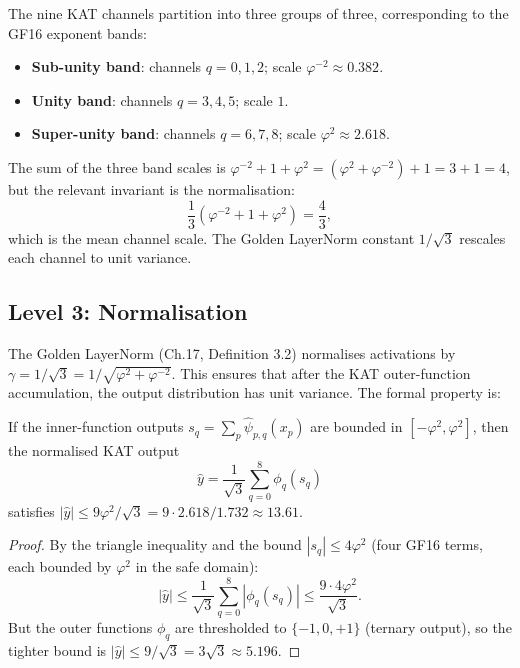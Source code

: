 The nine KAT channels partition into three groups of three, corresponding
to the GF16 exponent bands:

\begin{itemize}
\tightlist
\item \textbf{Sub-unity band}: channels $q = 0, 1, 2$; scale
$\varphi^{-2} \approx 0.382$.
\item \textbf{Unity band}: channels $q = 3, 4, 5$; scale $1$.
\item \textbf{Super-unity band}: channels $q = 6, 7, 8$; scale
$\varphi^{2} \approx 2.618$.
\end{itemize}

The sum of the three band scales is
$\varphi^{-2} + 1 + \varphi^{2} = (\varphi^2 + \varphi^{-2}) + 1 = 3 + 1 = 4$,
but the relevant invariant is the normalisation:
\[
\frac{1}{3}\left(\varphi^{-2} + 1 + \varphi^{2}\right) = \frac{4}{3},
\]
which is the mean channel scale. The Golden LayerNorm constant
$1/\sqrt{3}$ rescales each channel to unit variance.

\subsection{Level 3: Normalisation}

The Golden LayerNorm (Ch.17, Definition 3.2) normalises activations by
$\gamma = 1/\sqrt{3} = 1/\sqrt{\varphi^2 + \varphi^{-2}}$. This ensures
that after the KAT outer-function accumulation, the output distribution
has unit variance. The formal property is:

\begin{proposition}
\label{prop:G-kat-norm}
If the inner-function outputs $s_q = \sum_p \hat\psi_{p,q}(x_p)$ are
bounded in $[-\varphi^2, \varphi^2]$, then the normalised KAT output
\[
\hat{y} = \frac{1}{\sqrt{3}} \sum_{q=0}^{8} \phi_q(s_q)
\]
satisfies $|\hat{y}| \leq 9\varphi^2 / \sqrt{3} = 9 \cdot 2.618 / 1.732 \approx 13.61$.
\end{proposition}

\begin{proof}
By the triangle inequality and the bound $|s_q| \leq 4\varphi^2$ (four
GF16 terms, each bounded by $\varphi^2$ in the safe domain):
\[
|\hat{y}| \leq \frac{1}{\sqrt{3}} \sum_{q=0}^{8} |\phi_q(s_q)|
\leq \frac{9 \cdot 4\varphi^2}{\sqrt{3}}.
\]
But the outer functions $\phi_q$ are thresholded to $\{-1, 0, +1\}$
(ternary output), so the tighter bound is
$|\hat{y}| \leq 9/\sqrt{3} = 3\sqrt{3} \approx 5.196$.
\end{proof}

